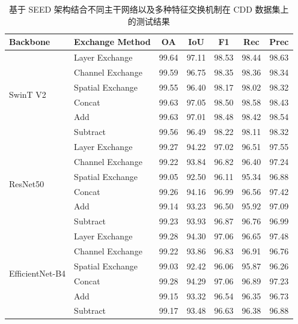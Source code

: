 \begin{table}[!htb]
\centering
\caption{基于 SEED 架构结合不同主干网络以及多种特征交换机制在 CDD 数据集上的测试结果}
\label{tab:seed_cdd_backbone}
\begin{tabular}{l l c c c c c}
\hline
\textbf{Backbone} & \textbf{Exchange Method} & \textbf{OA} & \textbf{IoU} & \textbf{F1} & \textbf{Rec} & \textbf{Prec} \\
\hline
\multirow{6}{*}{SwinT V2} 
 & Layer Exchange    & 99.64 & 97.11 & 98.53 & 98.44 & 98.63 \\
 & Channel Exchange  & 99.59 & 96.75 & 98.35 & 98.36 & 98.34 \\
 & Spatial Exchange  & 99.55 & 96.40 & 98.17 & 98.02 & 98.32 \\
\cline{2-7}
 & Concat            & 99.63 & 97.05 & 98.50 & 98.58 & 98.43 \\
 & Add               & 99.63 & 97.01 & 98.48 & 98.42 & 98.54 \\
 & Subtract             & 99.56	& 96.49	& 98.22	& 98.11	& 98.32 \\

\hline
\multirow{6}{*}{ResNet50} 
 & Layer Exchange    & 99.27 & 94.22 & 97.02 & 96.51 & 97.55 \\
 & Channel Exchange  & 99.22 & 93.84 & 96.82 & 96.40 & 97.24 \\
 & Spatial Exchange  & 99.05 & 92.50 & 96.11 & 95.34 & 96.88 \\
\cline{2-7}
 & Concat            & 99.26	& 94.16	& 96.99	& 96.56	& 97.42 \\
 & Add               & 99.14 & 93.23 & 96.50 & 95.92 & 97.09 \\
 & Subtract             & 99.23 & 93.93 & 96.87 & 96.76 & 96.99 \\
\hline
\multirow{6}{*}{EfficientNet-B4} 
 & Layer Exchange    & 99.28 & 94.30 & 97.06 & 96.65 & 97.48 \\
 & Channel Exchange  & 99.22 & 93.86 & 96.83 & 96.91 & 96.76 \\
 & Spatial Exchange  & 99.03 & 92.42 & 96.06 & 95.87 & 96.26 \\
\cline{2-7}
 & Concat            & 99.28	& 94.29	& 97.06	& 96.89	& 97.23 \\
 & Add               & 99.15	& 93.32	& 96.54	& 96.35	& 96.73 \\
 & Subtract             & 99.17	& 93.48	& 96.63	& 96.38	& 96.88 \\

\hline
\end{tabular}
\end{table}


